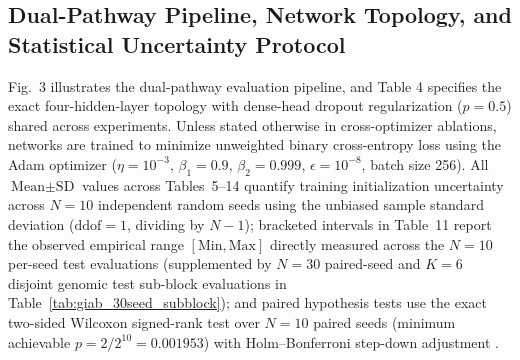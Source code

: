 \documentclass[11pt, a4paper]{article}
\begin{document}
\subsection{Dual-Pathway Pipeline, Network Topology, and Statistical Uncertainty Protocol}
Fig.\ 3 illustrates the dual-pathway evaluation pipeline, and Table 4 specifies the exact four-hidden-layer topology with dense-head dropout regularization ($p = 0.5$) \cite{ref37} shared across experiments. Unless stated otherwise in cross-optimizer ablations, networks are trained to minimize unweighted binary cross-entropy loss using the Adam optimizer \cite{ref38} ($\eta = 10^{-3}$, $\beta_1 = 0.9$, $\beta_2 = 0.999$, $\epsilon = 10^{-8}$, batch size 256). All $\text{Mean} \pm \text{SD}$ values across Tables~5--14 quantify training initialization uncertainty across $N = 10$ independent random seeds using the unbiased sample standard deviation ($\text{ddof}=1$, dividing by $N-1$); bracketed intervals in Table~11 report the observed empirical range $[\mathrm{Min}, \mathrm{Max}]$ directly measured across the $N=10$ per-seed test evaluations (supplemented by $N=30$ paired-seed and $K=6$ disjoint genomic test sub-block evaluations in Table~\ref{tab:giab_30seed_subblock}); and paired hypothesis tests use the exact two-sided Wilcoxon signed-rank test over $N = 10$ paired seeds (minimum achievable $p = 2/2^{10} = 0.001953$) with Holm--Bonferroni step-down adjustment \cite{ref36}.
\end{document}
